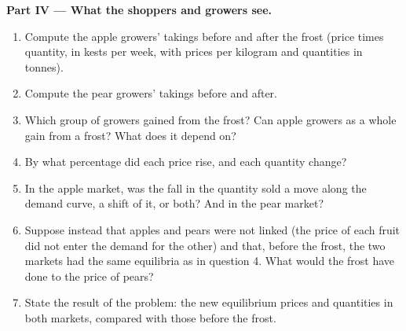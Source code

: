 \begin{problem}
\medskip
\noindent\textbf{Part IV --- What the shoppers and growers see.}
\begin{enumerate}[resume]
\item Compute the apple growers' takings before and after the frost (price times quantity, in kests per week, with prices per kilogram and
  quantities in tonnes).
\item Compute the pear growers' takings before and after.
\item Which group of growers gained from the frost? Can apple growers as a whole gain from a frost? What does it depend on?
\item By what percentage did each price rise, and each quantity change?
\item In the apple market, was the fall in the quantity sold a move along the demand curve, a shift of it, or both? And in the pear market?
\item Suppose instead that apples and pears were not linked (the price of each fruit did not enter the demand for the other) and that, before the
  frost, the two markets had the same equilibria as in question 4. What would the frost have done to the price of pears?
\item State the result of the problem: the new equilibrium prices and quantities in both markets, compared with those before the frost.
\end{enumerate}
\end{problem}
